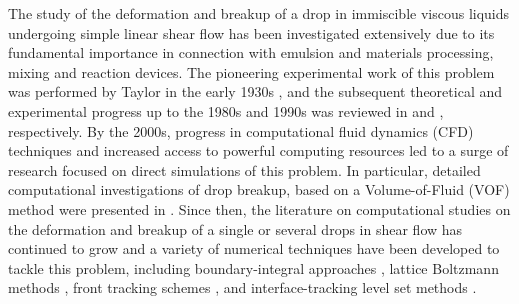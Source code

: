 \documentclass[%
 reprint,
 showkeys,
 amsmath,amssymb,
 aps,
 prfluids,
 onecolumn
]{revtex4-2}
\begin{document}
%
%
The study of the deformation and breakup of a drop in immiscible viscous
liquids undergoing simple linear shear flow has been investigated extensively
due to its fundamental importance in connection with emulsion and materials
processing, mixing and reaction devices. The pioneering experimental work
of this problem was performed by Taylor in the early 1930s \cite{Tay32, Tay34},
and the subsequent theoretical and experimental progress up to the 1980s and
1990s was reviewed in \cite{Ral84} and \cite{Sto94}, respectively.  By the
2000s, progress in computational fluid dynamics (CFD) techniques and increased
access to powerful computing resources led to a surge of research focused on
direct simulations of this problem.  In particular, detailed computational
investigations of drop breakup, 
based on a Volume-of-Fluid (VOF) method \cite{HirNic81} were
presented in \cite{LiRenRen00, RenCri01-1, RenCri01-2, RenCriLi02,
KhiRenCri03,Ren06,Ren07,Ren08-2}.  Since then, the literature on computational
studies on the deformation and breakup of a single or several drops in shear
flow has continued to grow \cite{CriGuiAlfBlaLoe03, InaTomOgi03,ZhaMikBan06,
BazAndMei06, JanAnd08, CroGriSch10,KomShaEskDer14,KomShaEskDer15, IoaLiuZha16,
HerRan17,AmaBalCasOli19, ZhaShuGuaYan21} and a variety of numerical techniques
have been developed to tackle this problem, including boundary-integral
approaches \cite{CriBlaLoe01, JanAnd07}, lattice Boltzmann methods \cite{Ina06,
KomShaEskDer14}, front tracking schemes \cite{UnvTry92}, and interface-tracking
level set methods \cite{SusSmeOsh94}.  
\end{document}
